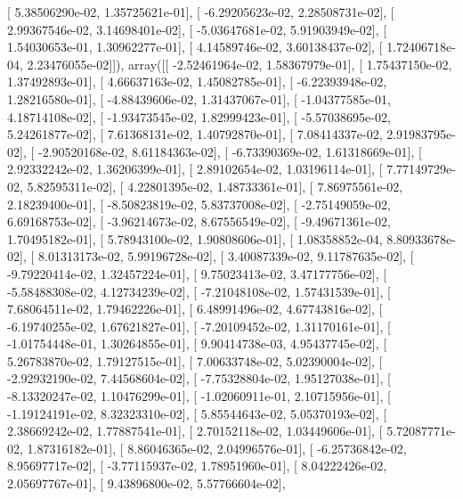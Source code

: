 \documentclass{article}
\begin{document}
       [  5.38506290e-02,   1.35725621e-01],
       [ -6.29205623e-02,   2.28508731e-02],
       [  2.99367546e-02,   3.14698401e-02],
       [ -5.03647681e-02,   5.91903949e-02],
       [  1.54030653e-01,   1.30962277e-01],
       [  4.14589746e-02,   3.60138437e-02],
       [  1.72406718e-04,   2.23476055e-02]]), array([[ -2.52461964e-02,   1.58367979e-01],
       [  1.75437150e-02,   1.37492893e-01],
       [  4.66637163e-02,   1.45082785e-01],
       [ -6.22393948e-02,   1.28216580e-01],
       [ -4.88439606e-02,   1.31437067e-01],
       [ -1.04377585e-01,   4.18714108e-02],
       [ -1.93473545e-02,   1.82999423e-01],
       [ -5.57038695e-02,   5.24261877e-02],
       [  7.61368131e-02,   1.40792870e-01],
       [  7.08414337e-02,   2.91983795e-02],
       [ -2.90520168e-02,   8.61184363e-02],
       [ -6.73390369e-02,   1.61318669e-01],
       [  2.92332242e-02,   1.36206399e-01],
       [  2.89102654e-02,   1.03196114e-01],
       [  7.77149729e-02,   5.82595311e-02],
       [  4.22801395e-02,   1.48733361e-01],
       [  7.86975561e-02,   2.18239400e-01],
       [ -8.50823819e-02,   5.83737008e-02],
       [ -2.75149059e-02,   6.69168753e-02],
       [ -3.96214673e-02,   8.67556549e-02],
       [ -9.49671361e-02,   1.70495182e-01],
       [  5.78943100e-02,   1.90808606e-01],
       [  1.08358852e-04,   8.80933678e-02],
       [  8.01313173e-02,   5.99196728e-02],
       [  3.40087339e-02,   9.11787635e-02],
       [ -9.79220414e-02,   1.32457224e-01],
       [  9.75023413e-02,   3.47177756e-02],
       [ -5.58488308e-02,   4.12734239e-02],
       [ -7.21048108e-02,   1.57431539e-01],
       [  7.68064511e-02,   1.79462226e-01],
       [  6.48991496e-02,   4.67743816e-02],
       [ -6.19740255e-02,   1.67621827e-01],
       [ -7.20109452e-02,   1.31170161e-01],
       [ -1.01754448e-01,   1.30264855e-01],
       [  9.90414738e-03,   4.95437745e-02],
       [  5.26783870e-02,   1.79127515e-01],
       [  7.00633748e-02,   5.02390004e-02],
       [ -2.92932190e-02,   7.44568604e-02],
       [ -7.75328804e-02,   1.95127038e-01],
       [ -8.13320247e-02,   1.10476299e-01],
       [ -1.02060911e-01,   2.10715956e-01],
       [ -1.19124191e-02,   8.32323310e-02],
       [  5.85544643e-02,   5.05370193e-02],
       [  2.38669242e-02,   1.77887541e-01],
       [  2.70152118e-02,   1.03449606e-01],
       [  5.72087771e-02,   1.87316182e-01],
       [  8.86046365e-02,   2.04996576e-01],
       [ -6.25736842e-02,   8.95697717e-02],
       [ -3.77115937e-02,   1.78951960e-01],
       [  8.04222426e-02,   2.05697767e-01],
       [  9.43896800e-02,   5.57766604e-02],
\end{document}
